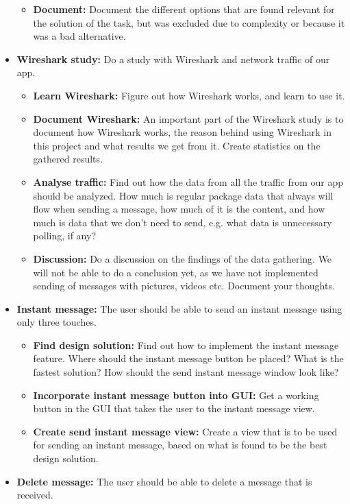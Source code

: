\begin{itemize}
\begin{itemize}
\item{}\textbf{Document:} Document the different options that are found relevant for the solution of the task, but was excluded due to complexity or because it was a bad alternative.
\end{itemize}
\item{}\textbf{Wireshark study:} Do a study with Wireshark and network traffic of our app.
\begin{itemize}
\item{}\textbf{Learn Wireshark:} Figure out how Wireshark works, and learn to use it.
\item{}\textbf{Document Wireshark:} An important part of the Wireshark study is to document how Wireshark works, the reason behind using Wireshark in this project and what results we get from it. Create statistics on the gathered results.
\item{}\textbf{Analyse traffic:} Find out how the data from all the traffic from our app should be analyzed. How much is regular package data that always will flow when sending a message, how much of it is the content, and how much is data that we don’t need to send, e.g. what data is unnecessary polling, if any?
\item{}\textbf{Discussion:} Do a discussion on the findings of the data gathering. We will not be able to do a conclusion yet, as we have not implemented sending of messages with pictures, videos etc. Document your thoughts.
\end{itemize}
\item{}\textbf{Instant message:} The user should be able to send an instant message using only three touches.
\begin{itemize}
\item{}\textbf{Find design solution:} Find out how to implement the instant message feature. Where should the instant message button be placed? What is the fastest solution? How should the send instant message window look like?
\item{}\textbf{Incorporate instant message button into GUI:} Get a working button in the GUI that takes the user to the instant message view.
\item{}\textbf{Create send instant message view:} Create a view that is to be used for sending an instant message, based on what is found to be the best design solution.
\end{itemize}
\item{}\textbf{Delete message:} The user should be able to delete a message that is received.
\begin{itemize}

\end{itemize}
\end{itemize}
